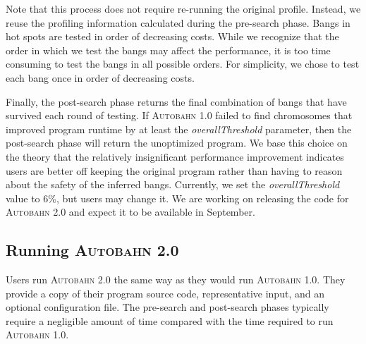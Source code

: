 \documentclass[format=sigplan, review=true, 9pt]{acmart}
\newcommand{\SHOWCOMMENT}[1]{\ifdraft #1 \fi}
\newcommand{\ksf}[1]{\SHOWCOMMENT{{\color{tuftsblue} [K: #1]}}}
\newcommand{\cut}[1]{}
\newcommand{\hotspot}[0]{hot spot}
\newcommand{\hotspots}[0]{hot spots}
\newcommand{\coldspots}[0]{cold spots}
\newcommand{\Ao}[0]{\textsc{Autobahn 1.0}}
\newcommand{\At}[0]{\textsc{Autobahn 2.0}}
\newcommand{\preopt}[0]{pre-search}
\newcommand{\postopt}[0]{post-search}
\newcommand{\absim}[0]{\textit{absenceImpact}}
\newcommand{\overallThreshold}[0]{\textit{overallThreshold}}
\begin{document}
Note that this process does not require re-running the original
profile.  Instead, we reuse the profiling information calculated
during the \preopt{} phase.  Bangs in \hotspots{} are tested in order
of decreasing costs. While we recognize that the order in which we
test the bangs may affect the performance, it is too time consuming to
test the bangs in all possible orders.  For simplicity, we chose to
test each bang once in order of decreasing costs.

\cut{
\ksf{For your thesis or for the final version, it might be worth
playing around a bit to see if the order makes any difference.  For
example, do the results change substantially if you wonder them in
increasing order instead?   Or is it just random.}}

Finally, the \postopt{} phase returns the final combination of bangs
that have survived each round of testing. If \Ao{} failed to find 
chromosomes that improved program runtime by at least the
\overallThreshold{} parameter, then
the \postopt{} phase will return the unoptimized program.
We base this choice on the
theory that the relatively insignificant performance improvement
indicates users are better off keeping the original program rather
than having to reason about the safety of the inferred bangs. 
Currently, we set the \overallThreshold{} value to 6\%, but users
may change it.   We are working on releasing the code for \At{} and
expect it to be available in September.



\cut{
The resulting chromosome is further tested and reduced using GHC
profiling information in the \postopt{} bang reduction phase. After an
initial pass of elimination to get rid of all turned-off bangs and
bangs located in \coldspots{}, we individually test the impact of the
absence of a turned-on bang in each \hotspot{}. If a bang meets
the \absim{} threshold, it is kept in future rounds of testing and
will remain in the final combination of bangs for the optimized
program. If a bang does not meet the \absim{} threshold, it is removed
for future rounds of testing and will not appear in the final
combination.
}


\subsection{Running \At{}}

Users run \At{} the same way as they would run \Ao{}. They
provide a copy of their program source code, representative input,
and an optional configuration file. The \preopt{}
and \postopt{} phases typically require a negligible amount of time
compared with the time required to run \Ao{}.
\end{document}
